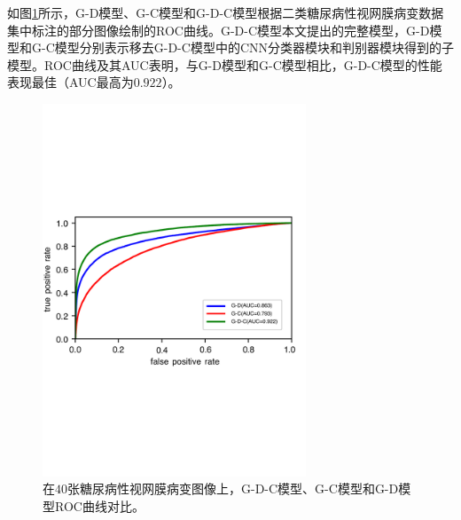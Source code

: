 如图\ref{fig:roc_u_d_u_c_u_d_c_components}所示，G-D模型、G-C模型和G-D-C模型根据二类糖尿病性视网膜病变数据集中标注的部分图像绘制的ROC曲线。G-D-C模型本文提出的完整模型，G-D模型和G-C模型分别表示移去G-D-C模型中的CNN分类器模块和判别器模块得到的子模型。ROC曲线及其AUC表明，与G-D模型和G-C模型相比，G-D-C模型的性能表现最佳（AUC最高为$0.922$）。
\begin{figure}[H]
	\centering
	\includegraphics[width=0.7\textwidth]{figure/ROC_u_d_u_c_u_d_c_components}
	\caption[G-D-C模型、G-C模型和G-D模型ROC曲线对比]{在$40$张糖尿病性视网膜病变图像上，G-D-C模型、G-C模型和G-D模型ROC曲线对比。}
	\label{fig:roc_u_d_u_c_u_d_c_components}
\end{figure}
\endinput
